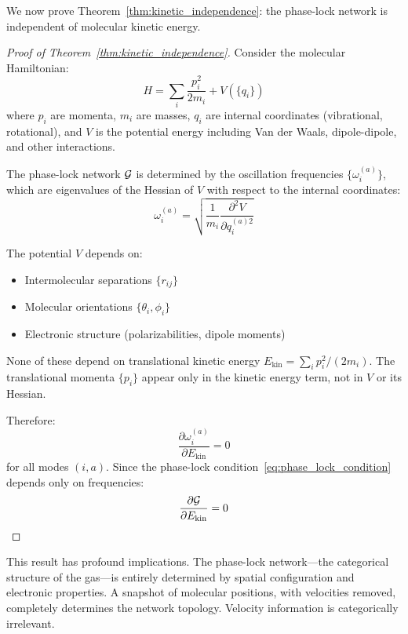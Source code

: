 We now prove Theorem~\ref{thm:kinetic_independence}: the phase-lock network is independent of molecular kinetic energy.

\begin{proof}[Proof of Theorem~\ref{thm:kinetic_independence}]
Consider the molecular Hamiltonian:
\begin{equation}
H = \sum_i \frac{p_i^2}{2m_i} + V(\{q_i\})
\label{eq:hamiltonian}
\end{equation}
where $p_i$ are momenta, $m_i$ are masses, $q_i$ are internal coordinates (vibrational, rotational), and $V$ is the potential energy including Van der Waals, dipole-dipole, and other interactions.

The phase-lock network $\mathcal{G}$ is determined by the oscillation frequencies $\{\omega_i^{(a)}\}$, which are eigenvalues of the Hessian of $V$ with respect to the internal coordinates:
\begin{equation}
\omega_i^{(a)} = \sqrt{\frac{1}{m_i}\frac{\partial^2 V}{\partial q_i^{(a)2}}}
\label{eq:frequencies}
\end{equation}

The potential $V$ depends on:
\begin{itemize}
\item Intermolecular separations $\{r_{ij}\}$
\item Molecular orientations $\{\theta_i, \phi_i\}$
\item Electronic structure (polarizabilities, dipole moments)
\end{itemize}

None of these depend on translational kinetic energy $E_{\text{kin}} = \sum_i p_i^2/(2m_i)$. The translational momenta $\{p_i\}$ appear only in the kinetic energy term, not in $V$ or its Hessian.

Therefore:
\begin{equation}
\frac{\partial \omega_i^{(a)}}{\partial E_{\text{kin}}} = 0
\end{equation}
for all modes $(i, a)$. Since the phase-lock condition~\eqref{eq:phase_lock_condition} depends only on frequencies:
\begin{equation}
\frac{\partial \mathcal{G}}{\partial E_{\text{kin}}} = 0
\end{equation}
\end{proof}

This result has profound implications. The phase-lock network---the categorical structure of the gas---is entirely determined by spatial configuration and electronic properties. A snapshot of molecular positions, with velocities removed, completely determines the network topology. Velocity information is categorically irrelevant.

